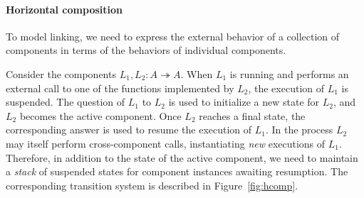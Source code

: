\documentclass[11pt,oneside,draft]{book}
\theoremstyle{definition}
\newcommand{\kw}[1]{\ensuremath{ \mathsf{#1} }}
\newcommand{\que}{\circ}         %
\newcommand{\ans}{\bullet}       %
\begin{document}


\paragraph{Horizontal composition} \label{sec:sem:linker} %

To model linking,
we need to express the external behavior
of a collection of components
in terms of the behaviors of
individual components.

Consider the components $L_1, L_2 : A \twoheadrightarrow A$.
When $L_1$ is running and performs an external call
to one of the functions implemented by $L_2$,
the execution of $L_1$ is suspended.
The question of $L_1$ to $L_2$
is used to initialize a new state for $L_2$,
and $L_2$ becomes the active component.
Once $L_2$ reaches a final state,
the corresponding answer is used to resume
the execution of $L_1$.
In the process
$L_2$ may itself perform cross-component calls,
instantiating \emph{new} executions of $L_1$.
Therefore,
in addition to the state of the active component,
we need to maintain a \emph{stack} of suspended states
for component instances awaiting resumption.
The corresponding transition system
is described in Figure~\ref{fig:hcomp}.
\end{document}
